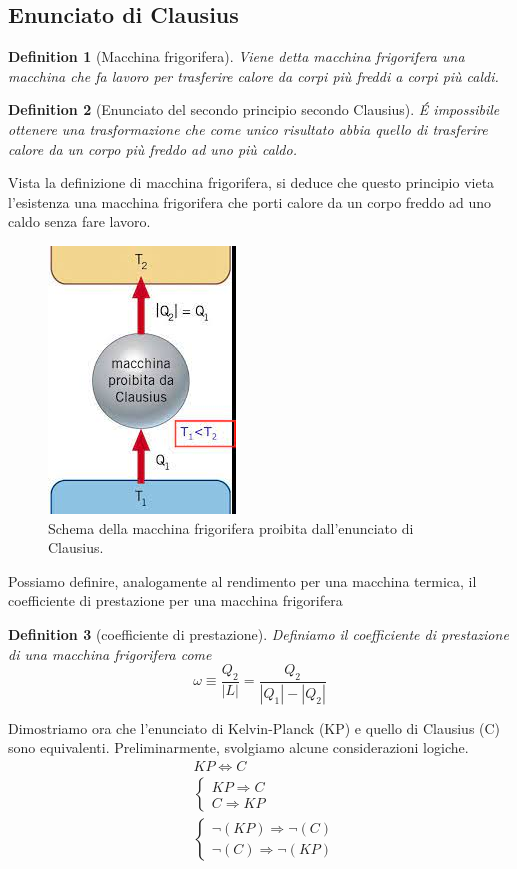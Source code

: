 \documentclass[10pt,a4paper]{article}
\newtheorem{definition}{Definition}
\begin{document}
\subsection{Enunciato di Clausius}
\begin{definition}[Macchina frigorifera]
	Viene detta macchina frigorifera una macchina che fa lavoro per trasferire calore da corpi più freddi a corpi più caldi. 
\end{definition}
\begin{definition}[Enunciato del secondo principio secondo Clausius]
	\'{E} impossibile ottenere una trasformazione che come unico risultato abbia quello di trasferire calore da un corpo più freddo ad uno più caldo. 
\end{definition}
Vista la definizione di macchina frigorifera, si deduce che questo principio vieta l'esistenza una macchina frigorifera che porti calore da un corpo freddo ad uno caldo senza fare lavoro. 
\begin{figure}[h!]
	\centering
	\includegraphics[width=0.3\linewidth]{../images/clausius}
	\caption{Schema della macchina frigorifera proibita dall'enunciato di Clausius.}
	\label{fig:clausius}
\end{figure}
\FloatBarrier
Possiamo definire, analogamente al rendimento per una macchina termica, il coefficiente di prestazione per una macchina frigorifera
\begin{definition}[coefficiente di prestazione]
	Definiamo il coefficiente di prestazione di una macchina frigorifera come \[\omega \equiv \frac{Q_2}{|L|} = \frac{Q_2}{|Q_1|-|Q_2|}\]
\end{definition}
Dimostriamo ora che l'enunciato di Kelvin-Planck (KP) e quello di Clausius (C) sono equivalenti. Preliminarmente, svolgiamo alcune considerazioni logiche.
\begin{align*}
	&KP \Leftrightarrow C\\
	&\begin{cases}
		KP \Rightarrow C\\
		C \Rightarrow KP
	\end{cases}\\
	&\begin{cases}
		\neg(KP)\Rightarrow \neg(C)\\
		\neg(C)\Rightarrow \neg(KP)
	\end{cases}
\end{align*}
\end{document}
